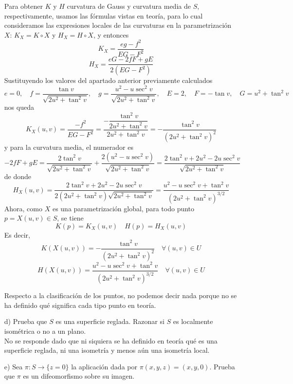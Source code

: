\documentclass[12pt]{article}
\begin{document}
\begin{ejercicio}
\begin{enumerate}
            Para obtener $K$ y $H$ curvatura de Gauss y curvatura media de $S$, respectivamente, usamos las fórmulas vistas en teoría,
            para lo cual consideramos las expresiones locales de las curvaturas en la parametrización $X$: $K_X = K \circ X$ y 
            $H_X = H \circ X$, y entonces
            $$K_X = \dfrac{eg - f^2}{EG - F^2}$$
            $$H_X = \dfrac{eG - 2fF + gE}{2(EG-F^2)}$$
            Sustituyendo los valores del apartado anterior previamente calculados
            $$e = 0, \quad f = \dfrac{\tan v}{\sqrt{2u^2 + \tan^2v}}, \quad g = \dfrac{u^2 - u\sec^2 v}{\sqrt{2u^2 + \tan^2v}}, \quad E = 2, \quad F = - \tan v, \quad G = u^2 + \tan^2 v$$
            nos queda
            $$K_X(u,v) = \dfrac{-f^2}{EG-F^2} = \dfrac{-\dfrac{\tan^2v}{2u^2 + \tan^2v}}{2u^2 + \tan^2v} = -\dfrac{\tan^2v}{(2u^2 + \tan^2v)^2}$$
            y para la curvatura media, el numerador es
            $$-2fF + gE = \dfrac{2\tan^2 v}{\sqrt{2u^2 + \tan^2v}} + \dfrac{2(u^2 - u \sec^2v)}{\sqrt{2u^2 + \tan^2v}} = 
            \dfrac{2\tan^2 v + 2u^2 - 2u \sec^2 v}{\sqrt{2u^2 + \tan^2v}}$$
            de donde
            $$H_X(u,v) = \dfrac{2 \tan^2v + 2u^2 - 2u \sec^2 v}{2(2u^2 + \tan^2v)\sqrt{2u^2 + \tan^2v}} = 
            \dfrac{u^2 - u \sec^2v + \tan^2 v}{(2u^2 + \tan^2 v)^{3/2}}$$
            Ahora, como $X$ es una parametrización global, para todo punto $p = X(u,v) \in S$, se tiene
            $$K(p) = K_X(u,v) \quad H(p) = H_X(u,v)$$
            Es decir,
            $$\boxed{K(X(u,v)) = -\dfrac{\tan^2v}{(2u^2 + \tan^2v)^2} \quad \forall (u,v) \in U}$$
            $$\boxed{H(X(u,v)) = \dfrac{u^2 - u \sec^2v + \tan^2 v}{(2u^2 + \tan^2 v)^{3/2}} \quad \forall (u,v) \in U}$$

            Respecto a la clasificación de los puntos, no podemos decir nada porque no se ha definido qué significa cada tipo punto en teoría. 

            \item[d)] Prueba que $S$ es una superficie reglada. Razonar si $S$ es localmente isométrica o no a un plano. \\
            
            No se responde dado que ni siquiera se ha definido en teoría qué es una superficie reglada, ni una isometría y menos aún una 
            isometría local.

            \item[e)] Sea $\pi:S\to \{z=0\}$ la aplicación dada por $\pi(x,y,z)=(x,y,0)$. Prueba que $\pi$ es un difeomorfismo 
            sobre su imagen. \\


\end{enumerate}
\end{ejercicio}
\end{document}
